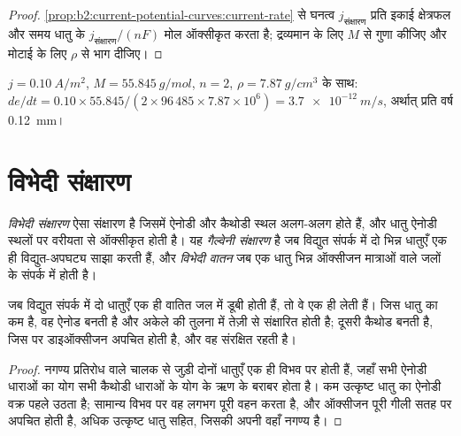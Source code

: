 \begin{proof}
\cref{prop:b2:current-potential-curves:current-rate} से 
घनत्व $j_{\text{संक्षारण}}$ प्रति इकाई क्षेत्रफल और समय धातु के $j_{\text{संक्षारण}}/(nF)$ मोल ऑक्सीकृत करता है;
द्रव्यमान के लिए $M$ से गुणा कीजिए और मोटाई के लिए $\rho$ से भाग दीजिए।
\end{proof}

\begin{example}\label{ex:b2:corrosion:rate}
$j = \qty{0.10}{A/m^2}$, $M = \qty{55.845}{g/mol}$, $n = 2$, $\rho =
\qty{7.87}{g/cm^3}$ के साथ: $de/dt = 0.10 \times 55.845/(2 \times 96\,485 \times 7.87
\times 10^6) = \qty{3.7e-12}{m/s}$, अर्थात् प्रति वर्ष \qty{0.12}{mm}।
\end{example}

\section{विभेदी संक्षारण}

\begin{definition}[विभेदी संक्षारण]\label{def:b2:corrosion:differential}
\emph{विभेदी संक्षारण} ऐसा संक्षारण है जिसमें
ऐनोडी और कैथोडी स्थल अलग-अलग होते हैं, और धातु ऐनोडी स्थलों पर
वरीयता से ऑक्सीकृत होती है। यह \emph{गैल्वेनी
संक्षारण} है जब विद्युत संपर्क में दो भिन्न धातुएँ
एक ही विद्युत-अपघट्य साझा करती हैं, और \emph{विभेदी
वातन} जब एक धातु भिन्न ऑक्सीजन मात्राओं वाले जलों के
संपर्क में होती है।
\end{definition}

\begin{proposition}[संपर्क में दो धातुएँ]\label{prop:b2:corrosion:galvanic}
जब विद्युत संपर्क में दो धातुएँ एक ही वातित जल में डूबी होती हैं, तो वे
एक ही  लेती हैं। जिस धातु का  कम है, वह
ऐनोड बनती है और अकेले की तुलना में तेज़ी से संक्षारित होती है; दूसरी कैथोड बनती है,
जिस पर डाइऑक्सीजन अपचित होती है, और वह संरक्षित रहती है।
\end{proposition}

\begin{proof}
नगण्य प्रतिरोध वाले चालक से जुड़ी दोनों धातुएँ
एक ही विभव पर होती हैं, जहाँ सभी ऐनोडी धाराओं का योग सभी
कैथोडी धाराओं के योग के ऋण के बराबर होता है। कम उत्कृष्ट धातु का ऐनोडी वक्र पहले उठता है;
सामान्य विभव पर वह लगभग पूरी  वहन करता है, और
ऑक्सीजन पूरी गीली सतह पर अपचित होती है, अधिक उत्कृष्ट धातु सहित,
जिसकी अपनी  वहाँ नगण्य है।
\end{proof}

